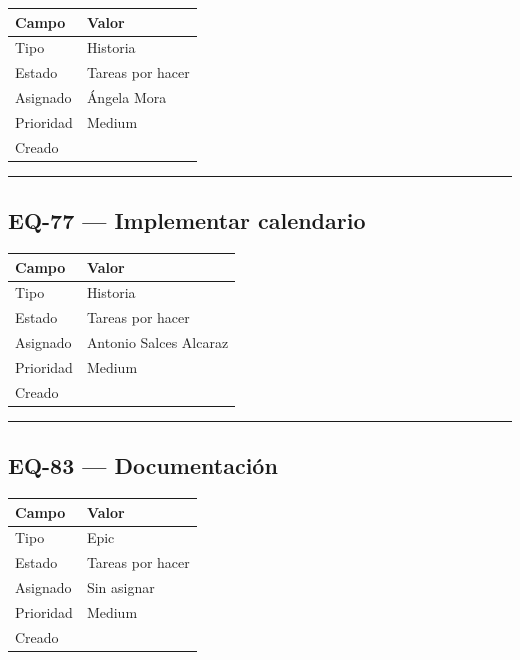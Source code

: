 \documentclass[
  spanish,
  11pt,
]{report}
\newcounter{none} %
\begin{document}
{\def\LTcaptype{none} %
\begin{longtable}[]{@{}ll@{}}
\toprule\noalign{}
Campo & Valor \\
\midrule\noalign{}
\endhead
\bottomrule\noalign{}
\endlastfoot
Tipo & Historia \\
Estado & Tareas por hacer \\
Asignado & Ángela Mora \\
Prioridad & Medium \\
Creado & \\
\end{longtable}
}

\begin{center}\rule{0.5\linewidth}{0.5pt}\end{center}

\subsection{EQ-77 --- Implementar
calendario}\label{eq-77-implementar-calendario}

{\def\LTcaptype{none} %
\begin{longtable}[]{@{}ll@{}}
\toprule\noalign{}
Campo & Valor \\
\midrule\noalign{}
\endhead
\bottomrule\noalign{}
\endlastfoot
Tipo & Historia \\
Estado & Tareas por hacer \\
Asignado & Antonio Salces Alcaraz \\
Prioridad & Medium \\
Creado & \\
\end{longtable}
}

\begin{center}\rule{0.5\linewidth}{0.5pt}\end{center}

\subsection{EQ-83 --- Documentación}\label{eq-83-documentaciuxf3n}

{\def\LTcaptype{none} %
\begin{longtable}[]{@{}ll@{}}
\toprule\noalign{}
Campo & Valor \\
\midrule\noalign{}
\endhead
\bottomrule\noalign{}
\endlastfoot
Tipo & Epic \\
Estado & Tareas por hacer \\
Asignado & Sin asignar \\
Prioridad & Medium \\
Creado & \\
\end{longtable}
}
\end{document}
